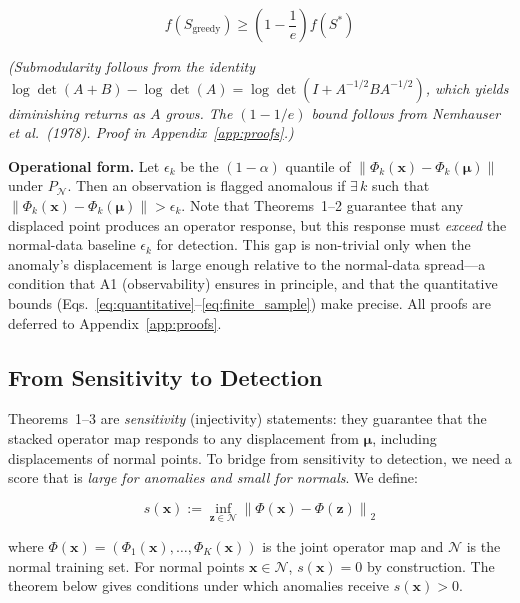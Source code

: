 \documentclass[journal]{IEEEtran}
\newcommand{\norm}[1]{\left\lVert#1\right\rVert}
\begin{document}
\begin{equation}
f(S_{\text{greedy}}) \geq \left(1 - \frac{1}{e}\right) f(S^*)
\label{eq:greedy_bound}
\end{equation}

\textit{(Submodularity follows from the identity $\log\det(A+B) - \log\det(A) = \log\det(I + A^{-1/2}BA^{-1/2})$, which yields diminishing returns as $A$ grows. The $(1-1/e)$ bound follows from Nemhauser et al.\ (1978). Proof in Appendix~\ref{app:proofs}.)}

\vspace{0.5em}

\textbf{Operational form.} Let $\epsilon_k$ be the $(1-\alpha)$ quantile of $\norm{\Phi_k(\mathbf{x}) - \Phi_k(\boldsymbol{\mu})}$ under $P_{\mathcal{N}}$. Then an observation is flagged anomalous if $\exists\, k$ such that $\norm{\Phi_k(\mathbf{x}) - \Phi_k(\boldsymbol{\mu})} > \epsilon_k$.  Note that Theorems~1--2 guarantee that any displaced point produces an operator response, but this response must \emph{exceed} the normal-data baseline $\epsilon_k$ for detection.  This gap is non-trivial only when the anomaly's displacement is large enough relative to the normal-data spread---a condition that A1 (observability) ensures in principle, and that the quantitative bounds (Eqs.~\eqref{eq:quantitative}--\eqref{eq:finite_sample}) make precise.  All proofs are deferred to Appendix~\ref{app:proofs}.

\subsection{From Sensitivity to Detection}
\label{ssec:detection}

Theorems~1--3 are \emph{sensitivity} (injectivity) statements: they guarantee that the stacked operator map responds to any displacement from $\boldsymbol{\mu}$, including displacements of normal points.  To bridge from sensitivity to detection, we need a score that is \emph{large for anomalies and small for normals}.  We define:

\begin{equation}
s(\mathbf{x}) := \inf_{\mathbf{z} \in \mathcal{N}} \norm{\Phi(\mathbf{x}) - \Phi(\mathbf{z})}_2
\label{eq:set_score}
\end{equation}

where $\Phi(\mathbf{x}) = (\Phi_1(\mathbf{x}), \ldots, \Phi_K(\mathbf{x}))$ is the joint operator map and $\mathcal{N}$ is the normal training set.  For normal points $\mathbf{x} \in \mathcal{N}$, $s(\mathbf{x}) = 0$ by construction.  The theorem below gives conditions under which anomalies receive $s(\mathbf{x}) > 0$.
\end{document}
